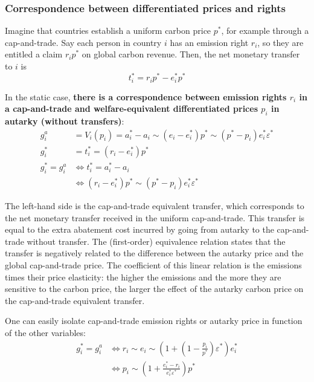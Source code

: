\documentclass[12pt,english]{article}
\begin{document}

\subsubsection*{Correspondence between differentiated prices and
rights}\label{correspondence-between-differentiated-prices-and-rights}

Imagine that countries establish a uniform carbon price $p^*$, for example through a cap-and-trade. Say each person in country $i$ has an emission right $r_i$, so they are entitled a claim $r_i p^*$ on global carbon revenue. Then, the net monetary transfer to $i$ is $$t^*_i = r_i p^* - e^*_i p^*$$

In the static case, \textbf{there is a correspondence between emission
rights $r_i$ in a cap-and-trade and welfare-equivalent differentiated prices $p_i$ in
autarky (without transfers)}: $$\begin{aligned}
g^a_i &= V_i(p_i) = a^*_i - a_i \sim (e_i - e^*_i) p^* \sim (p^* - p_i) e^*_i  \varepsilon^* \\
g^*_i &= t^*_i = (r_i - e^*_i) p^* \\
g^*_i = g^a_i &\Leftrightarrow t^*_i = a^*_i - a_i \\
&\Leftrightarrow (r_i - e^*_i) p^* \sim (p^* - p_i) e^*_i  \varepsilon^*
\end{aligned}$$

The left-hand side is the cap-and-trade equivalent transfer, which corresponds to the net monetary transfer received in the uniform cap-and-trade. This transfer is equal to the extra abatement cost incurred by going from autarky to the cap-and-trade without transfer. The (first-order) equivalence relation states that the transfer is negatively related to the difference between the autarky price and the global cap-and-trade price. The coefficient of this linear relation is the emissions times their price elasticity: the higher the emissions and the more they are sensitive to the carbon price, the larger the effect of the autarky carbon price on the cap-and-trade equivalent transfer.

One can easily isolate cap-and-trade emission rights or autarky price in function of the other variables: $$\begin{aligned}
g^*_i = g^a_i &\Leftrightarrow r_i \sim e_i \sim (1 + (1 - \frac{p_i}{p^*}) \varepsilon^*) e_i^*  \\
&\Leftrightarrow p_i \sim (1 + \frac{e^*_i - r_i}{e^*_i  \varepsilon^*}) p^*
\end{aligned}$$
\end{document}
